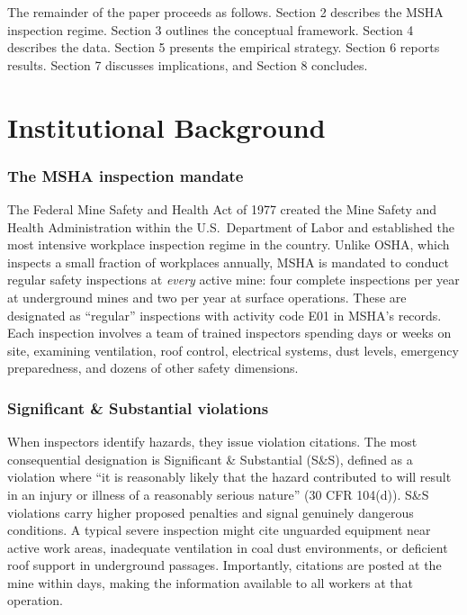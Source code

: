 \documentclass[12pt]{article}
\begin{document}
The remainder of the paper proceeds as follows. Section 2 describes the MSHA inspection regime. Section 3 outlines the conceptual framework. Section 4 describes the data. Section 5 presents the empirical strategy. Section 6 reports results. Section 7 discusses implications, and Section 8 concludes.


\section{Institutional Background}

\subsubsection*{The MSHA inspection mandate} The Federal Mine Safety and Health Act of 1977 created the Mine Safety and Health Administration within the U.S.\ Department of Labor and established the most intensive workplace inspection regime in the country. Unlike OSHA, which inspects a small fraction of workplaces annually, MSHA is mandated to conduct regular safety inspections at \textit{every} active mine: four complete inspections per year at underground mines and two per year at surface operations. These are designated as ``regular'' inspections with activity code E01 in MSHA's records. Each inspection involves a team of trained inspectors spending days or weeks on site, examining ventilation, roof control, electrical systems, dust levels, emergency preparedness, and dozens of other safety dimensions.

\subsubsection*{Significant \& Substantial violations} When inspectors identify hazards, they issue violation citations. The most consequential designation is Significant \& Substantial (S\&S), defined as a violation where ``it is reasonably likely that the hazard contributed to will result in an injury or illness of a reasonably serious nature'' (30 CFR 104(d)). S\&S violations carry higher proposed penalties and signal genuinely dangerous conditions. A typical severe inspection might cite unguarded equipment near active work areas, inadequate ventilation in coal dust environments, or deficient roof support in underground passages. Importantly, citations are posted at the mine within days, making the information available to all workers at that operation.
\end{document}
